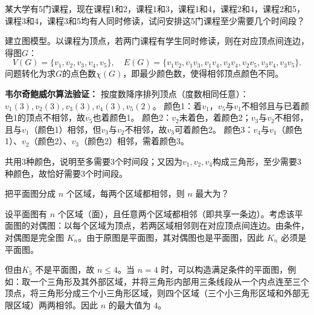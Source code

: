 \documentclass[lang=cn,11pt]{elegantbook}
\begin{document}
\begin{example}
    某大学有5门课程，现在课程1和2，课程1和3，课程1和4，课程2和4，课程2和5，课程3和4，课程3和5均有人同时修读，试问安排这5门课程至少需要几个时间段？
\end{example}
建立图模型。以课程为顶点，若两门课程有学生同时修读，则在对应顶点间连边，得图$G$：
\[
V(G)=\{v_1,v_2,v_3,v_4,v_5\},\quad
E(G)=\{v_1v_2,v_1v_3,v_1v_4,v_2v_4,v_2v_5,v_3v_4,v_3v_5\}.
\]
问题转化为求$G$的点色数$\chi(G)$，即最少颜色数，使得相邻顶点颜色不同。

\textbf{韦尔奇鲍威尔算法验证：}
 按度数降序排列顶点（度数相同任意）：$v_1(3),v_2(3),v_3(3),v_4(3),v_5(2)$。
 颜色1：着$v_1$，$v_5$与$v_1$不相邻且与已着颜色1的顶点不相邻，故$v_5$也着颜色1。
 颜色2：$v_2$未着色，着颜色2；$v_3$与$v_2$不相邻，且与$v_1$（颜色1）相邻，但$v_3$与$v_2$不相邻，故$v_3$可着颜色2。
 颜色3：$v_4$与$v_1$（颜色1）、$v_2$（颜色2）、$v_3$（颜色2）相邻，需着颜色3。

共用3种颜色，说明至多需要3个时间段；又因为$v_1,v_2,v_4$构成三角形，至少需要3种颜色，故恰好需要3个时间段。
\begin{example}
把平面图分成 $n$ 个区域，每两个区域都相邻，则 $n$ 最大为？
\end{example}
设平面图有 $n$ 个区域（面），且任意两个区域都相邻（即共享一条边）。考虑该平面图的对偶图：以每个区域为顶点，若两区域相邻则在对应顶点间连边。由条件，对偶图是完全图 $K_n$。由于原图是平面图，其对偶图也是平面图，因此 $K_n$ 必须是平面图。

但由$K_5$ 不是平面图，故 $n \le 4$。当 $n=4$ 时，可以构造满足条件的平面图，例如：取一个三角形及其外部区域，并将三角形内部用三条线段从一个内点连至三个顶点，将三角形分成三个小三角形区域，则四个区域（三个小三角形区域和外部无限区域）两两相邻。因此 $n$ 的最大值为 $4$。

\newpage
\end{document}

